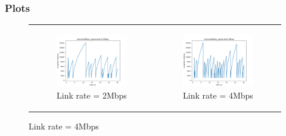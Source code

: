 \documentclass[11pt]{article}
\begin{document}
\subsubsection{Plots}\label{sec:application}
\begin{figure}[H]
  \centering
  \begin{tabular}[c]{cc}
    \begin{subfigure}[c]{0.5\textwidth}
      \centering
      \includegraphics[width=\textwidth]{Q2/outputs/channel6Mbps_application0.5Mbps.png}
      \caption{Link rate = 2Mbps}
    \end{subfigure}&

    \begin{subfigure}[c]{0.5\textwidth}
      \centering
      \includegraphics[width=\textwidth]{Q2/outputs/channel6Mbps_application1Mbps.png}
      \caption{Link rate = 4Mbps}
    \end{subfigure}\\


\end{tabular}
\end{figure}
\end{document}

